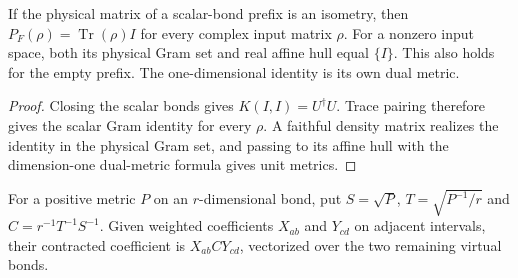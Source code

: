 \begin{lemma}
    \label{thm:mpu_endpoint_gram_normalization}
    \leanok
    If the physical matrix of a scalar-bond prefix is an isometry,
    then $P_F(\rho)=\operatorname{Tr}(\rho)I$ for every complex
    input matrix $\rho$. For a nonzero input space, both its
    physical Gram set and real affine hull equal $\{I\}$. This
    also holds for the empty prefix. The one-dimensional identity
    is its own dual metric.
\end{lemma}
\begin{proof}\leanok
    Closing the scalar bonds gives $K(I,I)=U^\dagger U$.
    Trace pairing therefore gives the scalar Gram identity for
    every $\rho$. A faithful density matrix realizes the identity
    in the physical Gram set, and passing to its affine hull with the
    dimension-one dual-metric formula gives unit metrics.
\end{proof}

\begin{definition}
    \label{def:mpu_normalized_interval_merger}
    \leanok
    For a positive metric $P$ on an $r$-dimensional bond, put
    $S=\sqrt P$, $T=\sqrt{P^{-1}/r}$ and
    $C=r^{-1}T^{-1}S^{-1}$.
    Given weighted coefficients $X_{ab}$ and $Y_{cd}$ on adjacent
    intervals, their contracted coefficient is $X_{ab}CY_{cd}$,
    vectorized over the two remaining virtual bonds.
\end{definition}

